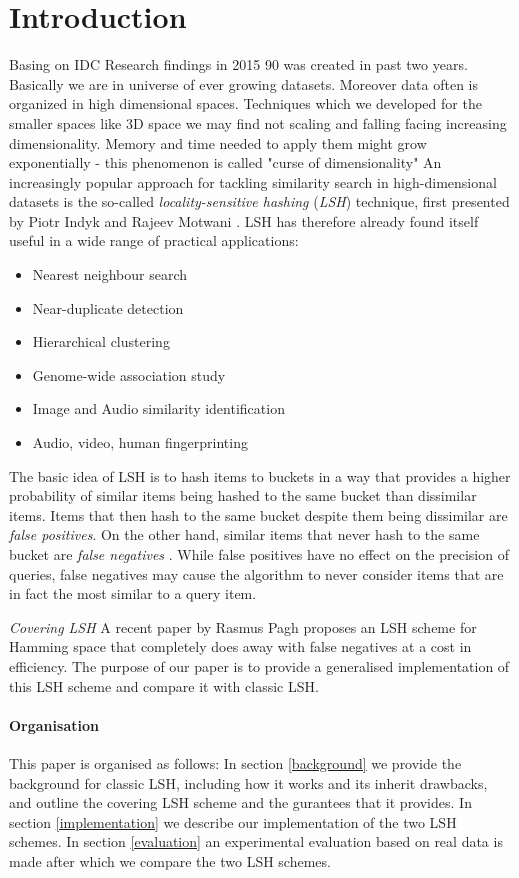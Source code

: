\section{Introduction}
\label{introduction}

Basing on IDC Research findings in 2015 90%
was created in past two years. Basically we are in universe of ever growing datasets.
Moreover data often is organized in high dimensional spaces. Techniques which we
developed for the smaller spaces like 3D space we may find not scaling and falling
facing increasing dimensionality. Memory and time needed to apply them might grow
exponentially - this phenomenon is called "curse of dimensionality"
An increasingly popular approach for tackling similarity search in high-dimensional
datasets is the so-called
\textit{locality-sensitive hashing}
(\textit{LSH}) technique, first presented by Piotr Indyk and Rajeev Motwani \cite{DBLP:conf/stoc/IndykM98}.
LSH has therefore already found itself useful in a wide range of practical applications:

\begin{itemize}
  \item Nearest neighbour search
  \item Near-duplicate detection
  \item Hierarchical clustering
  \item Genome-wide association study
  \item Image and Audio similarity identification
  \item Audio, video, human fingerprinting
\end{itemize}

The basic idea of LSH is to hash items to buckets in a way that provides a
higher probability of similar items being hashed to the same bucket than
dissimilar items. Items that then hash to the same bucket despite them being
dissimilar are \textit{false positives}. On the other hand, similar items that
never hash to the same bucket are \textit{false negatives} \cite[p. 88]{DBLP:books/cu/LeskovecRU14}.
 While false positives have no effect on the precision of queries, false
 negatives may cause the algorithm to never consider items that are in fact the
 most similar to a query item.

\textit{Covering LSH}
A recent paper by Rasmus Pagh \cite{DBLP:journals/corr/Pagh15} proposes an LSH
scheme for Hamming space that completely does away with false negatives at a
cost in efficiency. The purpose of our paper is to provide a generalised
implementation of this LSH scheme and compare it with classic LSH.

\paragraph{Organisation} This paper is organised as follows: In section
\ref{background} we provide the background for classic LSH, including how it
works and its inherit drawbacks, and outline the covering LSH scheme and the
gurantees that it provides. In section \ref{implementation} we describe our
implementation of the two LSH schemes. In section \ref{evaluation} an
experimental evaluation based on real data is made after which we compare the
two LSH schemes.
